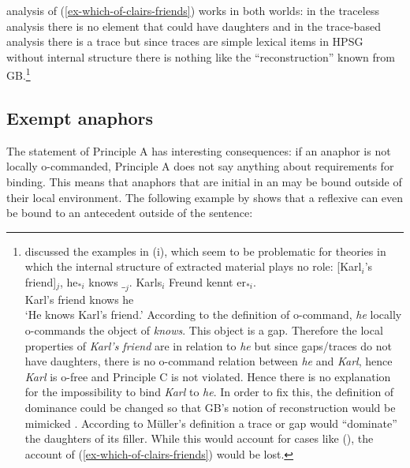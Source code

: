\documentclass[output=paper
 	        ,biblatex
                ,babelshorthands
                ,newtxmath
                ,draftmode
                ,colorlinks, citecolor=brown
]{langscibook}
\begin{document}
 analysis of (\ref{ex-which-of-clairs-friends}) works in both worlds: in the
traceless analysis there is no element that could have daughters and in the trace-based analysis
there is a trace but since traces are simple lexical items in HPSG without internal structure \citep[164]{ps2} there
is nothing like the ``reconstruction'' known from GB.\footnote{
\citet[Section~20.2]{Mueller99a} discussed the examples in (i), which seem to be problematic for
theories in which the internal structure of extracted material plays no role:
\eal
\ex {}[Karl$_i$'s friend]$_j$, he$_{*i}$ knows $\__j$.
\ex 
\gll Karls$_i$ Freund kennt er$_{*i}$.\\
     Karl's    friend knows he\\
\glt `He knows Karl's friend.'
\zl
According to the definition of o-command, \emph{he} locally o-commands the object of
\emph{knows}. This object is a gap. Therefore the local properties of \emph{Karl's
  friend} are in relation to \emph{he} but since gaps/traces do not have daughters, there is no o-command
relation between \emph{he} and \emph{Karl}, hence \emph{Karl} is o-free and Principle C is not
violated. Hence there is no explanation for the impossibility to bind \emph{Karl} to \emph{he}. In
order to fix this, the definition of dominance could be changed so that GB's notion of
reconstruction would be mimicked \citep[--410]{Mueller99a}. According to Müller's definition a trace or gap
would ``dominate'' the daughters of its filler. While this would account for cases like (),
the account of (\ref{ex-which-of-clairs-friends}) would be lost.
}

\subsection{Exempt anaphors}
\label{sec-excempt-anaphors}\label{binding:sec-excempt-anaphors}


The statement of Principle A has interesting consequences: if an anaphor is not locally o-commanded,
Principle A does not say anything about requirements for binding. This means that anaphors that are
initial in an \argstl may be bound outside of their local environment. The following example by
\citet[]{ps2} shows that a reflexive can even be bound to an antecedent outside of the sentence:
\end{document}
